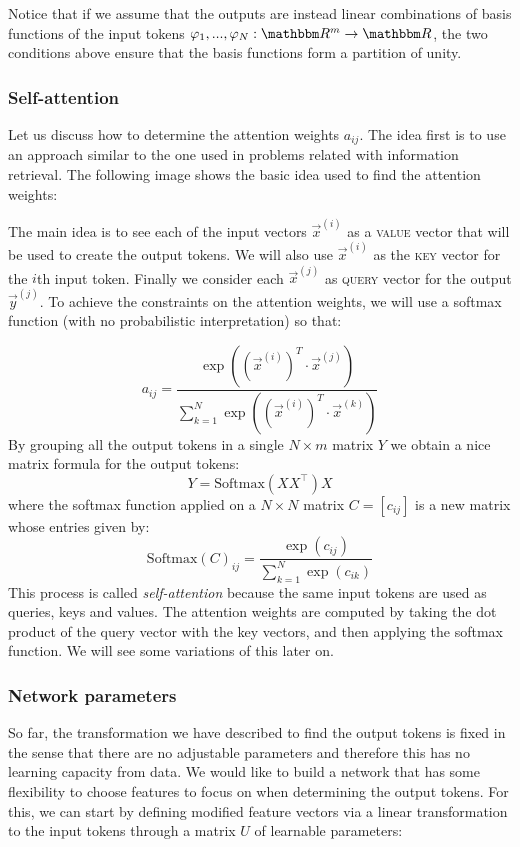 \begin{remark}
    Notice that if we assume that the outputs are instead linear combinations of basis functions of the input tokens $\phi_1,...,\phi_N : \RR^m \to \RR$, the two conditions above ensure that the basis functions form a partition of unity. 
\end{remark}


\subsubsection*{Self-attention}
    Let us discuss how to determine the attention weights $a_{ij}$. The idea first is to use an approach similar to the one used in problems related with information retrieval. The following image shows the basic idea used to find the attention weights: 



    The main idea is to see each of the input vectors $\vec{x}^{(i)}$ as a \textsc{value} vector that will be used to create the output tokens. We will also use $\vec{x}^{(i)}$ as the \textsc{key} vector for the $i$th input token. Finally  we consider each $\vec{x}^{(j)}$ as \textsc{query} vector for the output $\vec{y}^{(j)}$. To achieve the constraints on the attention weights, we will use a softmax function (with no probabilistic interpretation) so that: 

    \[
    a_{ij} = \frac{\exp((\vec{x}^{(i)})^{ T} \cdot \vec{x}^{(j)})}{\sum_{k=1}^N \exp((\vec{x}^{(i)})^{T} \cdot \vec{x}^{(k)})}
    \]
    By grouping all the output tokens in a single $N \times m$ matrix $Y$ we obtain a nice matrix formula for the output tokens: 
    \begin{equation}\label{Eq.subsec.self_attention.1}
        Y = \textrm{Softmax}(X X^\top) X 
    \end{equation}
    where the softmax function applied on a $N\times N$ matrix $C = [c_{ij}]$ is a new matrix whose entries given by:
    \[ \textrm{Softmax}(C)_{ij} = \frac{\exp(c_{ij})}{\sum_{k=1}^N \exp(c_{ik})} \] 
    This process is called \emph{self-attention} because the same input tokens are used as queries, keys and values. The attention weights are computed by taking the dot product of the query vector with the key vectors, and then applying the softmax function. We will see some variations of this later on.
    
    \subsubsection*{Network parameters}
    So far, the transformation we have described to find the output tokens is fixed in the sense that there are no adjustable parameters and therefore this has no learning capacity from data. We would like to build a network that has some flexibility to choose features to focus on when determining the output tokens. For this, we can start by defining modified feature vectors via a linear transformation to the input tokens through a matrix $U$ of learnable parameters:

